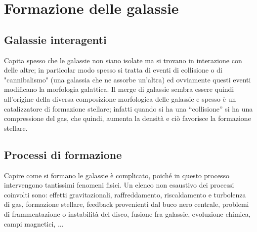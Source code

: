 \section{Formazione delle galassie}\label{sec:formazione-delle-galassie}
\subsection{Galassie interagenti}
Capita spesso che le galassie non siano isolate ma si trovano in interazione con delle altre; in particolar modo spesso si tratta di eventi di collisione o di "cannibalismo" (una galassia che ne assorbe un'altra) ed ovviamente questi eventi modificano la morfologia galattica. Il merge di galassie sembra essere quindi all’origine della diversa composizione morfologica delle galassie e spesso è un catalizzatore di formazione stellare; infatti quando si ha una “collisione” si ha una compressione del gas, che quindi, aumenta la densità e ciò favorisce la formazione stellare.

\subsection{Processi di formazione}
Capire come si formano le galassie è complicato, poiché in questo processo intervengono tantissimi fenomeni fisici. Un elenco non esaustivo dei processi coinvolti sono: effetti gravitazionali, raffreddamento, riscaldamento e turbolenza di gas, formazione stellare, feedback provenienti dal buco nero centrale, problemi di frammentazione o instabilità del disco, fusione fra galassie, evoluzione chimica, campi magnetici, ...

